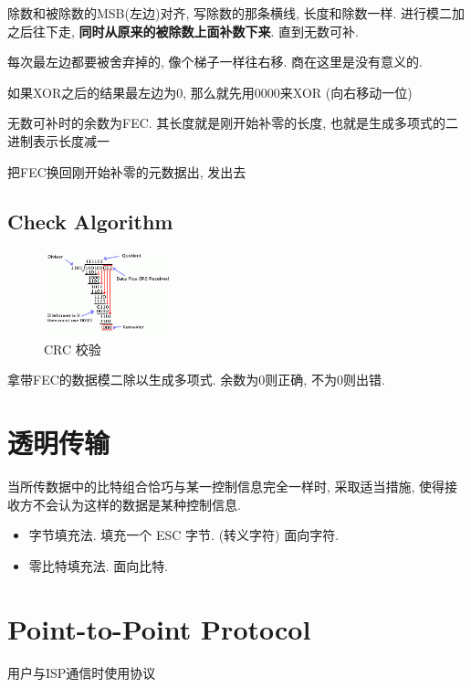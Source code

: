 \documentclass[a4paper]{report}
\begin{document}
除数和被除数的MSB(左边)对齐, 写除数的那条横线, 长度和除数一样. 进行模二加之后往下走, \textbf{同时从原来的被除数上面补数下来}. 直到无数可补. 

每次最左边都要被舍弃掉的, 像个梯子一样往右移. 商在这里是没有意义的. 

如果XOR之后的结果最左边为0, 那么就先用0000来XOR (向右移动一位)

无数可补时的余数为FEC. 其长度就是刚开始补零的长度, 也就是生成多项式的二进制表示长度减一

把FEC换回刚开始补零的元数据出, 发出去
\subsection{Check Algorithm}
\begin{figure}[H]
\centering
\includegraphics[width=0.33\textwidth]{crc_chk.png}
\caption{CRC 校验}
\end{figure}
拿带FEC的数据模二除以生成多项式. 余数为0则正确, 不为0则出错. 


\section{透明传输}
当所传数据中的比特组合恰巧与某一控制信息完全一样时, 采取适当措施, 使得接收方不会认为这样的数据是某种控制信息. 

\begin{itemize}
  \item 字节填充法. 填充一个 ESC 字节. (转义字符) 面向字符. 
  \item 零比特填充法. 面向比特. 
\end{itemize}



\section{Point-to-Point Protocol}
用户与ISP通信时使用协议
\end{document}
